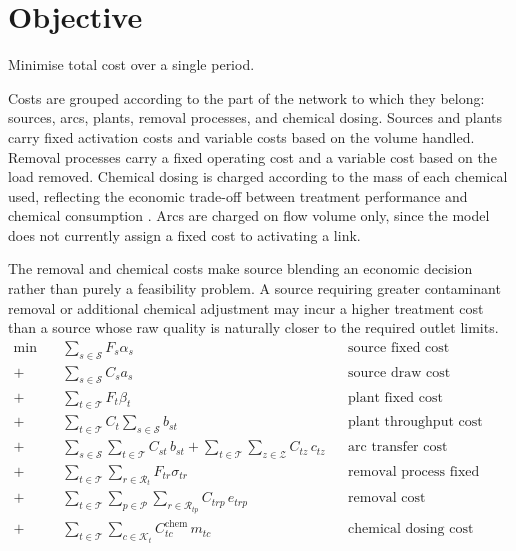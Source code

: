 \documentclass[10pt]{article}
\begin{document}
\section{Objective}
Minimise total cost over a single period.

Costs are grouped according to the part of the network to which they belong:
sources, arcs, plants, removal processes, and chemical dosing.
Sources and plants carry fixed activation costs and variable costs based on the volume handled.
Removal processes carry a fixed operating cost and a variable cost based on the load removed.
Chemical dosing is charged according to the mass of each chemical used, reflecting the economic trade-off between treatment performance and chemical consumption \cite{Li2022CoagulantDose}.
Arcs are charged on flow volume only, since the model does not currently assign a fixed cost to activating a link.

The removal and chemical costs make source blending an economic decision rather than purely a feasibility problem.
A source requiring greater contaminant removal or additional chemical adjustment may incur a higher treatment cost than a source whose raw quality is naturally closer to the required outlet limits.
\begin{equation}\label{eq:objective}
    \begin{aligned}
        \min \quad
                     & \sum_{s \in \mathcal{S}}
        F_s \alpha_s &                          & \text{source fixed cost} \\
        + \; & \sum_{s \in \mathcal{S}} C_s a_s & & \text{source draw cost} \\
        + \; & \sum_{t \in \mathcal{T}} F_t \beta_t & & \text{plant fixed cost} \\
        + \; & \sum_{t \in \mathcal{T}} C_t \sum_{s \in \mathcal{S}} b_{st} & & \text{plant throughput cost} \\
        + \; & \sum_{s \in \mathcal{S}} \sum_{t \in \mathcal{T}} C_{st}\, b_{st}
              + \sum_{t \in \mathcal{T}} \sum_{z \in \mathcal{Z}} C_{tz}\, c_{tz}
              & & \text{arc transfer cost} \\
        + \; & \sum_{t \in \mathcal{T}} \sum_{r \in \mathcal{R}_t} F_{tr} \sigma_{tr}
              & & \text{removal process fixed cost} \\
        + \; & \sum_{t \in \mathcal{T}} \sum_{p \in \mathcal{P}} \sum_{r \in \mathcal{R}_{tp}}
              C_{trp}\, e_{trp}
              & & \text{removal cost} \\
        + \; & \sum_{t \in \mathcal{T}} \sum_{c \in \mathcal{K}_t}
              C^{\mathrm{chem}}_{tc}\, m_{tc}
              & & \text{chemical dosing cost}
    \end{aligned}
\end{equation}
\end{document}
